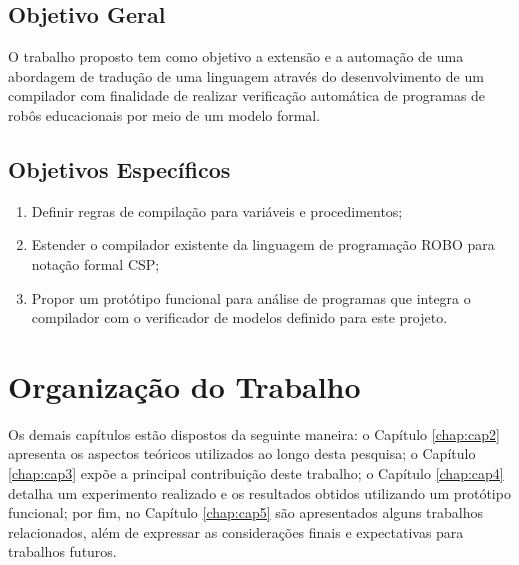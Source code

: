 \subsection{Objetivo Geral}

O trabalho proposto tem como objetivo a extensão e a automação de uma abordagem de tradução de uma linguagem através do desenvolvimento de um compilador com finalidade de realizar verificação automática de programas de robôs educacionais por meio de um modelo formal.

\subsection{Objetivos Específicos}

\begin{enumerate}
    \item Definir regras de compilação para variáveis e procedimentos;
    \item Estender o compilador existente da linguagem de programação ROBO para notação formal CSP;
    \item Propor um protótipo funcional para análise de programas que integra o compilador com o verificador de modelos definido para este projeto.

\end{enumerate}

\section{Organização do Trabalho}

Os demais capítulos estão dispostos da seguinte maneira: o Capítulo \ref{chap:cap2} apresenta os aspectos teóricos utilizados ao longo desta pesquisa; o Capítulo \ref{chap:cap3} expõe a principal contribuição deste trabalho; o Capítulo \ref{chap:cap4} detalha um experimento realizado e os resultados obtidos utilizando um protótipo funcional; por fim, no Capítulo \ref{chap:cap5} são apresentados alguns trabalhos relacionados, além de expressar as considerações finais e expectativas para trabalhos futuros.